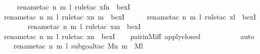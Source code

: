 \begin{isabellebody}
\ \ \ \isamarkupfalse%
{\isacharparenleft}{\kern0pt}rename{\isacharunderscore}{\kern0pt}tac\ n\ m\ l{\isacharcomma}{\kern0pt}\ rule{\isacharunderscore}{\kern0pt}tac\ x{\isacharequal}{\kern0pt}{\isachardoublequoteopen}f{\isacharbackquote}{\kern0pt}n{\isachardoublequoteclose}\ \ bexI{\isacharparenright}{\kern0pt}\isanewline
\ \ \ \ \isamarkupfalse%
{\isacharparenleft}{\kern0pt}rename{\isacharunderscore}{\kern0pt}tac\ n\ m\ l{\isacharcomma}{\kern0pt}\ rule{\isacharunderscore}{\kern0pt}tac\ x{\isacharequal}{\kern0pt}{\isachardoublequoteopen}{\isacharless}{\kern0pt}n{\isacharcomma}{\kern0pt}\ m{\isachargreater}{\kern0pt}{\isachardoublequoteclose}\ \ bexI{\isacharparenright}{\kern0pt}\isanewline
\ \ \ \ \ \isamarkupfalse%
{\isacharparenleft}{\kern0pt}rename{\isacharunderscore}{\kern0pt}tac\ n\ m\ l{\isacharcomma}{\kern0pt}\ rule{\isacharunderscore}{\kern0pt}tac\ x{\isacharequal}{\kern0pt}{\isachardoublequoteopen}l{\isachardoublequoteclose}\ \ bexI{\isacharparenright}{\kern0pt}\isanewline
\ \ \ \ \ \ \isamarkupfalse%
{\isacharparenleft}{\kern0pt}rename{\isacharunderscore}{\kern0pt}tac\ n\ m\ l{\isacharcomma}{\kern0pt}\ rule{\isacharunderscore}{\kern0pt}tac\ x{\isacharequal}{\kern0pt}{\isachardoublequoteopen}m{\isachardoublequoteclose}\ \ bexI{\isacharparenright}{\kern0pt}\isanewline
\ \ \ \ \ \ \ \ \isamarkupfalse%
{\isacharparenleft}{\kern0pt}rename{\isacharunderscore}{\kern0pt}tac\ n\ m\ l{\isacharcomma}{\kern0pt}\ rule{\isacharunderscore}{\kern0pt}tac\ x{\isacharequal}{\kern0pt}{\isachardoublequoteopen}n{\isachardoublequoteclose}\ \ bexI{\isacharparenright}{\kern0pt}\isanewline
\ \ \isamarkupfalse%
\ pair{\isacharunderscore}{\kern0pt}in{\isacharunderscore}{\kern0pt}M{\isacharunderscore}{\kern0pt}iff\ apply{\isacharunderscore}{\kern0pt}closed\isanewline
\ \ \ \ \ \ \ \ \ \isamarkupfalse%
\ auto{\isacharbrackleft}{\kern0pt}{}{\isacharbrackright}{\kern0pt}\isanewline
\ \ \isamarkupfalse%
{\isacharparenleft}{\kern0pt}rename{\isacharunderscore}{\kern0pt}tac\ n\ m\ l{\isacharcomma}{\kern0pt}\ subgoal{\isacharunderscore}{\kern0pt}tac\ {\isachardoublequoteopen}{\isacharparenleft}{\kern0pt}{\isacharhash}{\kern0pt}{\isacharhash}{\kern0pt}M{\isacharparenright}{\kern0pt}{\isacharparenleft}{\kern0pt}{\isacharless}{\kern0pt}n{\isacharcomma}{\kern0pt}\ m{\isachargreater}{\kern0pt}{\isacharparenright}{\kern0pt}\ {\isasymand}\ {\isacharparenleft}{\kern0pt}{\isacharhash}{\kern0pt}{\isacharhash}{\kern0pt}M{\isacharparenright}{\kern0pt}{\isacharparenleft}{\kern0pt}l{\isacharparenright}{\kern0pt}{\isachardoublequoteclose}{\isacharparenright}{\kern0pt}\isanewline

\end{isabellebody}
